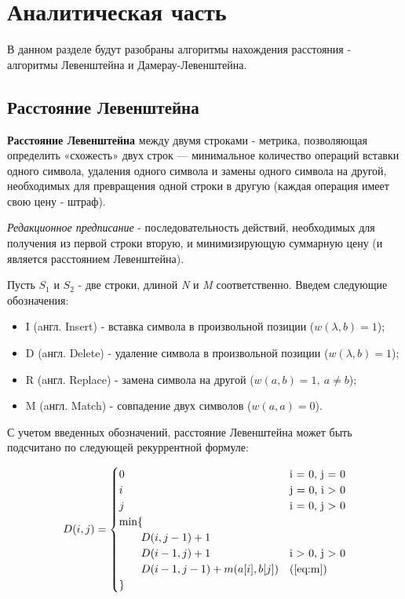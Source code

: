 \chapter{Аналитическая часть}

В данном разделе будут разобраны алгоритмы нахождения расстояния - алгоритмы Левенштейна и Дамерау-Левенштейна.

\section{Расстояние Левенштейна}

\textbf{Расстояние Левенштейна} \cite{levenshtein} между двумя строками - метрика, позволяющая определить «схожесть» двух строк — минимальное количество операций вставки одного символа, удаления одного символа и замены одного символа на другой, необходимых для превращения одной строки в другую (каждая операция имеет свою цену - штраф). \newline


\textit{Редакционное предписание} - последовательность действий, необходимых для получения из первой строки вторую, и минимизирующую суммарную цену (и является расстоянием Левенштейна).\newline


Пусть $S_{1}$ и $S_{2}$ - две строки, длиной \textit{N} и \textit{M} соответственно. Введем следующие обозначения:
\begin{itemize}
        \item I (aнгл. Insert) - вставка символа в произвольной позиции ($w(\lambda,b)=1$);
        \item D (aнгл. Delete) - удаление символа в произвольной позиции ($w(\lambda,b)=1$);
        \item R (aнгл. Replace) - замена символа на другой ($w(a,b)=1, \medspace a \neq b$);
        \item M (aнгл. Match) - совпадение двух символов ($w(a,a)=0$). \newline
\end{itemize} 


С учетом введенных обозначений, расстояние Левенштейна может быть подсчитано по следующей рекуррентной формуле:


\begin{equation}
	\label{eq:D}
	D(i, j) = \begin{cases}
		
		0 &\text{i = 0, j = 0}\\
		i &\text{j = 0, i > 0}\\
		j &\text{i = 0, j > 0}\\
		\min \lbrace \\
		\qquad D(i, j-1) + 1\\
		\qquad D(i-1, j) + 1 &\text{i > 0, j > 0}\\
		\qquad D(i-1, j-1) + m(a[i], b[j]) &\text(\ref{eq:m})\\
		\rbrace
	\end{cases}
\end{equation}


